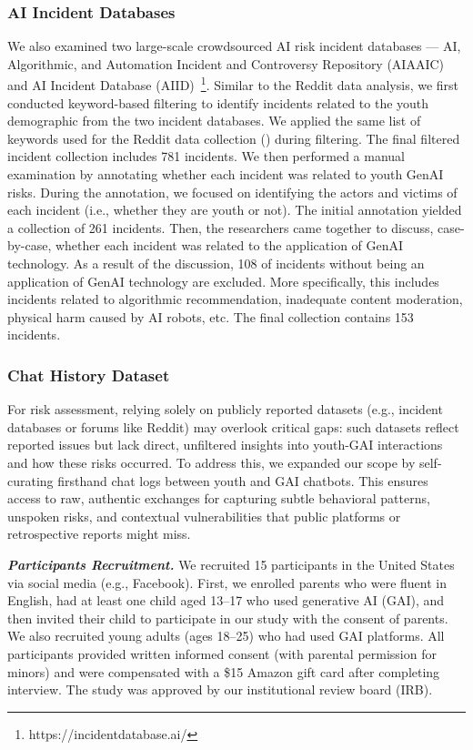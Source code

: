 \subsubsection{AI Incident Databases}
\vspace{-3pt}
We also examined two large-scale crowdsourced AI risk incident databases --- AI, Algorithmic, and Automation Incident and Controversy Repository (AIAAIC)~\cite{pownall2021ai} and AI Incident Database (AIID)~\footnote{https://incidentdatabase.ai/}{}. Similar to the Reddit data analysis, we first conducted keyword-based filtering to identify incidents related to the youth demographic from the two incident databases.  
We applied the same list of keywords used for the Reddit data collection () during filtering. 
The final filtered incident collection includes 781 incidents. 
We then performed a manual examination by annotating whether each incident was related to youth GenAI risks. 
During the annotation, we focused on identifying the actors and victims of each incident (i.e., whether they are youth or not).  
The initial annotation yielded a collection of 261 incidents. Then, the researchers came together to discuss, case-by-case, whether each incident was related to the application of GenAI technology. 
As a result of the discussion, 108 of incidents without being an application of GenAI technology are excluded. More specifically, this includes incidents related to algorithmic recommendation, inadequate content moderation, physical harm caused by AI robots, etc. The final collection contains 153 incidents.

\vspace{-8pt}
\subsubsection{Chat History Dataset}
\vspace{-3pt}
For risk assessment, relying solely on publicly reported datasets (e.g., incident databases or forums like Reddit) may overlook critical gaps: such datasets reflect reported issues but lack direct, unfiltered insights into youth-GAI interactions and how these risks occurred. To address this, we expanded our scope by self-curating firsthand chat logs between youth and GAI chatbots. This ensures access to raw, authentic exchanges for capturing subtle behavioral patterns, unspoken risks, and contextual vulnerabilities that public platforms or retrospective reports might miss.

\textit{\textbf{Participants Recruitment.}}
We recruited 15 participants in the United States via social media (e.g., Facebook). First, we enrolled parents who were fluent in English, had at least one child aged 13–17 who used generative AI (GAI), and then invited their child to participate in our study with the consent of parents. We also recruited young adults (ages 18–25) who had used GAI platforms. All participants provided written informed consent (with parental permission for minors) and were compensated with a \$15 Amazon gift card after completing interview. The study was approved by our institutional review board (IRB).

